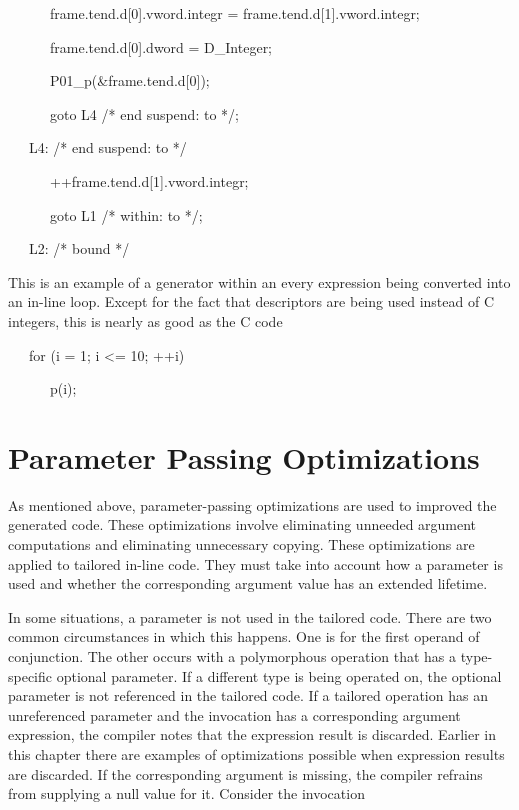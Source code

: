 {\ttfamily\mdseries
\ \ \ \ \ \ frame.tend.d[0].vword.integr = frame.tend.d[1].vword.integr;}

{\ttfamily\mdseries
\ \ \ \ \ \ frame.tend.d[0].dword = D\_Integer;}

{\ttfamily\mdseries
\ \ \ \ \ \ P01\_p(\&frame.tend.d[0]);}

{\ttfamily\mdseries
\ \ \ \ \ \ goto L4 /* end suspend: to */;}

{\ttfamily\mdseries
\ \ \ L4: /* end suspend: to */}

{\ttfamily\mdseries
\ \ \ \ \ \ ++frame.tend.d[1].vword.integr;}

{\ttfamily\mdseries
\ \ \ \ \ \ goto L1 /* within: to */;}

{\ttfamily\mdseries
\ \ \ L2: /* bound */}


This is an example of a generator within an every expression being
converted into an in-line loop. Except for the fact that descriptors
are being used instead of C integers, this is nearly as good as the C
code

{\ttfamily\mdseries
\ \ \ for (i = 1; i {\textless}= 10; ++i)}

{\ttfamily\mdseries
\ \ \ \ \ \ p(i);}


\section{Parameter Passing Optimizations}

As mentioned above, parameter-passing optimizations are used to
improved the generated code. These optimizations involve eliminating
unneeded argument computations and eliminating unnecessary
copying. These optimizations are applied to tailored in-line
code. They must take into account how a parameter is used and whether
the corresponding argument value has an extended lifetime.

In some situations, a parameter is not used in the tailored
code. There are two common circumstances in which this happens. One is
for the first operand of conjunction. The other occurs with a
polymorphous operation that has a type-specific optional parameter. If
a different type is being operated on, the optional parameter is not
referenced in the tailored code. If a tailored operation has an
unreferenced parameter and the invocation has a corresponding argument
expression, the compiler notes that the expression result is
discarded. Earlier in this chapter there are examples of optimizations
possible when expression results are discarded. If the corresponding
argument is missing, the compiler refrains from supplying a null value
for it. Consider the invocation

